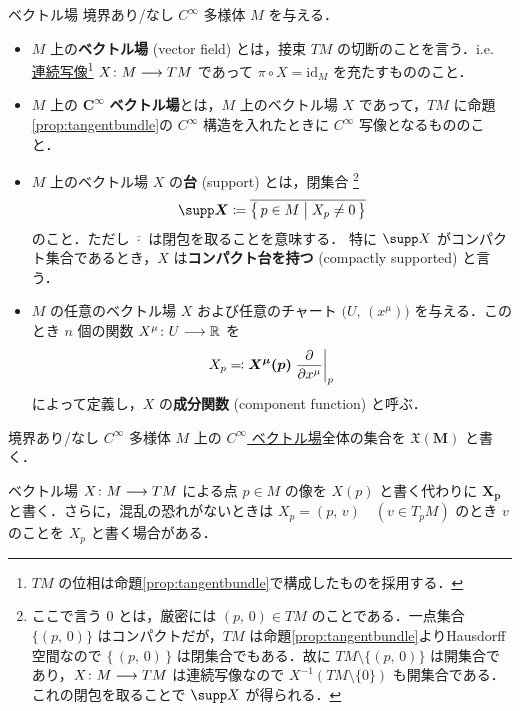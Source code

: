 \documentclass[TQFT_main]{subfiles}
\begin{document}
\begin{mydef}[label=def:vecf, breakable]{ベクトル場}
    境界あり/なし $C^\infty$ 多様体 $M$ を与える．
    \begin{itemize}
        \item $M$ 上の\textbf{ベクトル場} (vector field) とは，接束 $TM$ の切断のことを言う．i.e. \underline{連続写像}\footnote{$TM$ の位相は命題\ref{prop:tangentbundle}で構成したものを採用する．} $X \colon M \longrightarrow TM$ であって $\pi \circ X = \mathrm{id}_M$ を充たすもののこと．
        \item $M$ 上の $\bm{C^\infty}$ \textbf{ベクトル場}とは，$M$ 上のベクトル場 $X$ であって，$TM$ に命題\ref{prop:tangentbundle}の $C^\infty$ 構造を入れたときに $C^\infty$ 写像となるもののこと．
        \item $M$ 上のベクトル場 $X$ の\textbf{台} (support) とは，閉集合
        \footnote{ここで言う $0$ とは，厳密には $(p,\, 0) \in TM$ のことである．一点集合 $\{(p,\, 0) \}$ はコンパクトだが，$T M$ は命題\ref{prop:tangentbundle}よりHausdorff空間なので $\{\, (p,\, 0)\, \}$ は閉集合でもある．故に $T M \setminus \{(p,\, 0) \}$ は開集合であり，$X \colon M \longrightarrow TM$ は連続写像なので $X^{-1}(TM \setminus \{0\})$ も開集合である．これの閉包を取ることで $\supp X$ が得られる．}
        \begin{align}
            \bm{\supp X} \coloneqq \overline{\bigl\{\, p \in M \bigm| X_p \neq 0 \,\bigr\} }
        \end{align}
        のこと．ただし $\overline{\cdot}$ は閉包を取ることを意味する．
        特に $\supp X$ がコンパクト集合であるとき，$X$ は\textbf{コンパクト台を持つ} (compactly supported) と言う．
        \item $M$ の任意のベクトル場 $X$ および任意のチャート $\bigl(U,\, (x^\mu)\bigr)$ を与える．このとき $n$ 個の関数 $X^\mu \colon U \longrightarrow \mathbb{R}$ を
        \begin{align}
            X_p \eqqcolon \bm{X^\mu (p)} \eval{\pdv{}{x^\mu}}_p
        \end{align}
        によって定義し，$X$ の\textbf{成分関数} (component function) と呼ぶ．
    \end{itemize}
    \tcblower
    境界あり/なし $C^\infty$ 多様体 $M$ 上の \underline{$C^\infty$ ベクトル場}全体の集合を $\bm{\mathfrak{X}(M)}$ と書く．
\end{mydef}

\begin{marker}
    ベクトル場 $X \colon M \longrightarrow TM$ による点 $ p\in M$ の像を $X(p)$ と書く代わりに $\bm{X_p}$ と書く．さらに，混乱の恐れがないときは $X_p = (p,\, v)\quad (v \in T_p M)$ のとき $v$ のことを $X_p$ と書く場合がある．
\end{marker}
\end{document}
